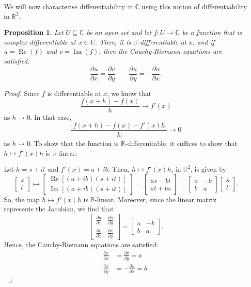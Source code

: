 \documentclass[a4paper, openany]{memoir}
\theoremstyle{definition}
\theoremstyle{plain}
\newtheorem{proposition}[definition]{Proposition}
\begin{document}
    We will now characterise differentiability in $\mathbb{C}$ using this notion of differentiability in $\mathbb{R}^2$.
    \begin{proposition}
        Let $U \subseteq \mathbb{C}$ be an open set and let $f \colon U \to \mathbb{C}$ be a function that is complex-differentiable at $x \in U$. Then, it is $\mathbb{R}$-differentiable at $x$, and if $u = \operatorname{Re}(f)$ and $v = \operatorname{Im}(f)$, then the Cauchy-Riemann equations are satisfied:
        \[\frac{\partial u}{\partial x} = \frac{\partial v}{\partial y} \qquad \frac{\partial u}{\partial y} = -\frac{\partial u}{\partial x}.\]
    \end{proposition}
    \begin{proof}
        Since $f$ is differentiable at $x$, we know that
        \[\frac{f(x + h) - f(x)}{h} \to f'(x)\]
        as $h \to 0$. In that case,
        \[\frac{|f(x + h) - f(x) - f'(x)h|}{|h|} \to 0\]
        as $h \to 0$. To show that the function is $\mathbb{R}$-differentiable, it suffices to show that $h \mapsto f'(x)h$ is $\mathbb{R}$-linear.

        Let $h = s + it$ and $f'(x) = a + ib$. Then, $h \mapsto f'(x)h$, in $\mathbb{R}^2$, is given by
        \[\begin{bmatrix}
            s \\ t
        \end{bmatrix} \mapsto \begin{bmatrix}
            \operatorname{Re}[(a + ib)(s + it)] \\
            \operatorname{Im}[(a + ib)(s + it)]
        \end{bmatrix} = \begin{bmatrix}
            as - bt \\
            at + bs
        \end{bmatrix} = \begin{bmatrix}
            a & -b \\
            b & a
        \end{bmatrix} \begin{bmatrix}
            s \\ t
        \end{bmatrix}.\]
        So, the map $h \mapsto f'(x)h$ is $\mathbb{R}$-linear. Moreover, since the linear matrix represents the Jacobian, we find that
        \[\begin{bmatrix}
            \frac{\partial u}{\partial x} & \frac{\partial u}{\partial y} \\
            \frac{\partial v}{\partial x} & \frac{\partial v}{\partial y}
        \end{bmatrix} = \begin{bmatrix}
            a & -b \\
            b & a
        \end{bmatrix}.\]
        Hence, the Cauchy-Riemann equations are satisfied:
        \begin{align*}
            \frac{\partial u}{\partial x} &= \frac{\partial v}{\partial y} = a \\
            \frac{\partial u}{\partial y} &= -\frac{\partial u}{\partial x} = b.
        \end{align*}
    \end{proof}
\end{document}
